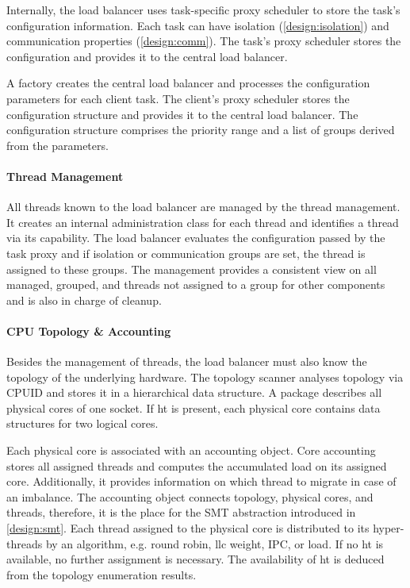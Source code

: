 Internally, the load balancer uses task-specific proxy scheduler to store the
task's configuration information.
Each task can have isolation (\ref{design:isolation}) and communication
properties (\ref{design:comm}).
The task's proxy scheduler stores the configuration and provides it to the
central load balancer.

A factory creates the central load balancer and processes the configuration
parameters for each client task.
The client's proxy scheduler stores the configuration structure and provides it
to the central load balancer.
The configuration structure comprises the priority range and a list of
groups derived from the parameters.


\paragraph{Thread Management}
All threads known to the load balancer are managed by the thread management.
It creates an internal administration class for each thread and identifies a
thread via its capability.
The load balancer evaluates the configuration passed by the task proxy and
if isolation or communication groups are set, the thread is assigned to these
groups.
The management provides a consistent view on all managed, grouped, and threads
not assigned to a group for other components and is also in charge of cleanup.


\paragraph{CPU Topology \& Accounting}
Besides the management of threads, the load balancer must also know the
topology of the underlying hardware.
The topology scanner analyses topology via CPUID and stores it in a
hierarchical data structure.
A package describes all physical cores of one socket.
If \gls{ht} is present, each physical core contains data structures for
two logical cores.

Each physical core is associated with an accounting object.
Core accounting stores all assigned threads and computes the accumulated
load on its assigned core.
Additionally, it provides information on which thread to migrate in case of an
imbalance.
The accounting object connects topology, physical cores, and threads, therefore,
it is the place for the SMT abstraction introduced in \ref{design:smt}.
Each thread assigned to the physical core is distributed to its hyper-threads
by an algorithm, e.g. round robin, \gls{llc} weight, IPC, or load.
If no \gls{ht} is available, no further assignment is necessary.
The availability of \gls{ht} is deduced from the topology enumeration results.


